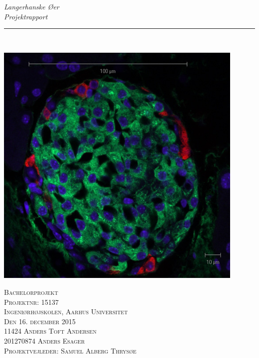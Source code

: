 \thispagestyle{empty}
\begin{center}
\vspace{3cm}

\phantom{hul}

\phantom{hul}

\phantom{hul}

\textsl{\Huge Langerhanske Øer} \\ %
\textsl{\Huge Projektrapport} \\ %

\rule{13cm}{3mm} \\ \vspace{1cm}

\includegraphics[width=0.9\textwidth]{billeder/forside.jpg}

\textsc{\center Bachelorprojekt \\
Projektnr: 15137 \\
Ingeniørhøjskolen, Aarhus Universitet \\
Den 16. december 2015 \\ \vspace{1cm}
11424	Anders Toft Andersen \\
201270874	Anders Esager \\
Projektvejleder: Samuel Alberg Thrysøe \\}
\end{center}
